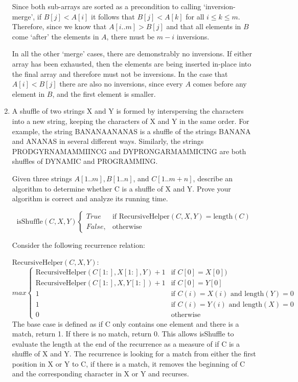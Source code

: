 \documentclass{article}
\newcommand{\question}[1]{\bgroup\color{blue}#1\egroup}
\begin{document}
\begin{enumerate}
Since both sub-arrays are sorted as a precondition to calling `inversion-merge', if $B[j] < A[i]$ it follows that $B[j] < A[k]$ for all $i \leq k \leq m$. Therefore, since we know that $A[i..m] > B[j]$ and that all elements in $B$ come `after' the elements in $A$, there must be $m-i$ inversions.

In all the other `merge' cases, there are demonstrably no inversions. If either array has been exhausted, then the elements are being inserted in-place into the final array and therefore must not be inversions. In the case that $A[i] < B[j]$ there are also no inversions, since every $A$ comes before any element in $B$, and the first element is smaller.

\item 
  \question{
A shuffle of two strings X and Y is formed by interspersing the characters into a new string,
keeping the characters of X and Y in the same order. For example, the string BANANAANANAS
is a shuffle of the strings BANANA and ANANAS in several different ways.
Similarly, the strings PRODGYRNAMAMMIINCG and DYPRONGARMAMMICING are both
shuffles of DYNAMIC and PROGRAMMING.
}

Given three strings $A[1..m], B[1..n]$, and $C[1..m + n]$, describe an algorithm to determine
whether C is a shuffle of X and Y. Prove your algorithm is correct and analyze its running time.

$$
\text{isShuffle}(C, X, Y) 
    \begin{cases}
    
      True & \text{if } \text{RecursiveHelper}(C,X,Y) = \text{length}(C) \\
    False, & \text{otherwise}
    \end{cases}
$$


Consider the following recurrence relation:


$\text{RecursiveHelper}(C, X, Y)$:\\
$$
    max  
    \begin{cases}
      \text{RecursiveHelper}(C[1:], X[1:], Y) + 1   & \text{if } C[0] = X[0])\\
      \text{RecursiveHelper}(C[1:], X, Y[1:]) + 1    & \text{if } C[0] = Y[0]\\
      1  & \text{if } C(i) = X(i) \text{ and } \text{length}(Y) = 0\\
      1  & \text{if } C(i) = Y(i) \text{ and } \text{length}(X) = 0\\
        0 & \text{otherwise}
    \end{cases}
$$
The base case is defined as if C only contains one element and there is a match, return 1. If there is no match, return 0. This allows isShuffle to evaluate the length at the end of the recurrence as a measure of if C is a shuffle of X and Y.
The recurrence is looking for a match from either the first position in X or Y to C, if there is a match, it removes the beginning of C and the corresponding character in X or Y and recurses. \\


\end{enumerate}
\end{document}
